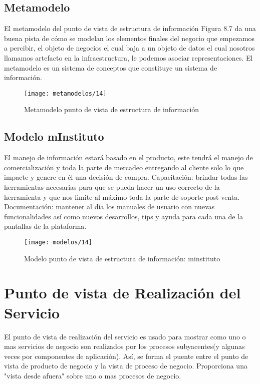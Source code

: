     \subsection{Metamodelo}
    El metamodelo del punto de vista de estructura de información Figura 8.7 da una buena pista de cómo se modelan los elementos finales del negocio que empezamos a percibir, el objeto de negocios el cual baja a un objeto de datos el cual nosotros llamamos artefacto en la infraestructura, le podemos asociar representaciones. El metamodelo es un sistema de conceptos que constituye un sistema de información.
    
    \begin{figure}[H]
    	\centering
    	\texttt{[image: metamodelos/14]}
    	\captionsetup{width=.95\textwidth}
    	\caption{Metamodelo punto de vista de estructura de información}
    	\label{metamodelo14}
    \end{figure}
    
    \subsection{Modelo mInstituto}
    El manejo de información estará basado en el producto, este tendrá el manejo de comercialización y toda la parte de mercadeo entregando al cliente solo lo que impacte y genere en él una decisión de compra. Capacitación: brindar todas las herramientas necesarias para que se pueda hacer un uso correcto de la herramienta y que nos limite al máximo toda la parte de soporte post-venta. Documentación: mantener al día los manuales de usuario con nuevas funcionalidades así como nuevos desarrollos, tips y ayuda para cada una de la pantallas de la plataforma.
    
    \begin{figure}[H]
    	\centering
    	\texttt{[image: modelos/14]}
    	\captionsetup{width=.95\textwidth}
    	\caption{Modelo punto de vista de estructura de información: minstituto}
    	\label{modelo14}
    \end{figure}
    
\section{Punto de vista de Realización del Servicio}
El punto de vista de realización del servicio es usado para mostrar como uno o mas servicios de negocio son realizados por los procesos subyacentes(y algunas veces por componentes de aplicación). Así, se forma el puente entre el punto de vista de producto de negocio y la vista de proceso de negocio. Proporciona una "vista desde afuera" sobre uno o mas procesos de negocio.
    

